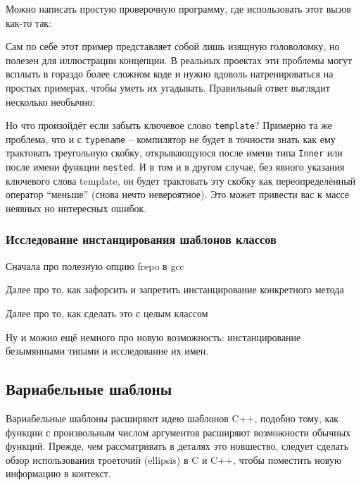 \documentclass[a4paper,12pt,oneside]{article}
\begin{document}
Можно написать простую проверочную программу, где использовать этот вызов как-то так:



Сам по себе этот пример представляет собой лишь изящную головоломку, но полезен для иллюстрации концепции. В реальных проектах эти проблемы могут всплыть в гораздо более сложном коде и нужно вдоволь натренироваться на простых примерах, чтобы уметь их угадывать. Правильный ответ выглядит несколько необычно:



Но что произойдёт если забыть ключевое слово \lstinline!template!? Примерно та же проблема, что и с \lstinline!typename! -- компилятор не будет в точности знать как ему трактовать треугольную скобку, открывающуюся после имени типа \lstinline!Inner! или после имени функции \lstinline!nested!. И в том и в другом случае, без явного указания ключевого слова template, он будет трактовать эту скобку как переопределённый оператор ``меньше'' (снова нечто невероятное). Это может привести вас к массе неявных но интересных ошибок.

\subsubsection{Исследование инстанцирования шаблонов классов}\label{ControlInstancing}

Сначала про полезную опцию frepo в gcc

Далее про то, как зафорсить и запретить инстанцирование конкретного метода

Далее про то, как сделать это с целым классом

Ну и можно ещё немного про новую возможность: инстанцирование безымянными типами и исследование их имен.

\pagebreak
\subsection{Вариабельные шаблоны}\label{VariadicTemplates}

Вариабельные шаблоны расширяют идею шаблонов C++, подобно тому, как функции с произвольным числом аргументов расширяют возможности обычных функций. Прежде, чем рассматривать в деталях это новшество, следует сделать обзор использования троеточий (ellipsis) в C и C++, чтобы поместить новую информацию в контекст.
\end{document}
